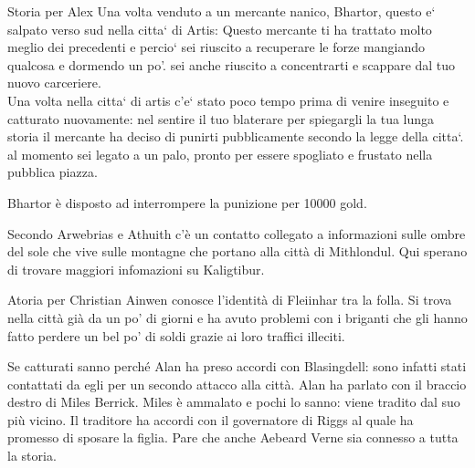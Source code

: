 \documentclass[10pt,twoside,twocolumn]{article}
\begin{document}
\begin{commentbox}{Storia per Alex}
  Una volta venduto a un mercante nanico, Bhartor, questo e` salpato verso sud nella citta` di Artis: Questo mercante ti ha trattato molto meglio dei precedenti e percio` sei riuscito a recuperare le forze mangiando qualcosa e dormendo un po'. sei anche riuscito a concentrarti e scappare dal tuo nuovo carceriere. \\
  Una volta nella citta` di artis c'e` stato poco tempo prima di venire inseguito e catturato nuovamente: nel sentire il tuo blaterare per spiegargli la tua lunga storia il mercante ha deciso di punirti pubblicamente secondo la legge della citta`. al momento sei legato a un palo, pronto per essere spogliato e frustato nella pubblica piazza.
\end{commentbox}
\begin{quotebox}
 Bhartor \`e disposto ad interrompere la punizione per 10000 gold.
\end{quotebox}
\begin{quotebox}
  Secondo Arwebrias e Athuith c'\`e un contatto collegato a informazioni sulle
  ombre del sole che vive sulle montagne che portano alla citt\`a di Mithlondul.
  Qui sperano di trovare maggiori infomazioni su Kaligtibur.
\end{quotebox}
\begin{commentbox}{Atoria per Christian}
  Ainwen conosce l'identit\`a di Fleiinhar tra la folla. Si trova nella citt\`a
  gi\`a da un po' di giorni e ha avuto problemi con i briganti che gli hanno fatto
  perdere un bel po' di soldi grazie ai loro traffici illeciti.
\end{commentbox}
\begin{quotebox}
  Se catturati sanno perch\'e Alan ha preso accordi con Blasingdell: sono infatti stati
  contattati da egli per un secondo attacco alla citt\`a. Alan ha parlato con il braccio
  destro di Miles Berrick. Miles \`e ammalato e pochi lo sanno: viene tradito dal
  suo pi\`u vicino. Il traditore ha accordi con il governatore di Riggs al quale
  ha promesso di sposare la figlia. Pare che anche Aebeard Verne sia connesso a tutta la
  storia.
\end{quotebox}
\end{document}
